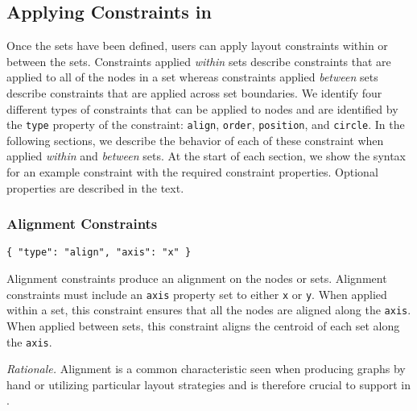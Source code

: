 \subsection{Applying Constraints in \projectname}
\label{sec:constraints}
Once the sets have been defined, users can apply layout constraints within or between the sets. Constraints applied \emph{within} sets describe constraints that are applied to all of the nodes in a set whereas constraints applied \emph{between} sets describe constraints that are applied across set boundaries. We identify four different types of constraints that can be applied to nodes and are identified by the \texttt{type} property of the constraint: \texttt{align}, \texttt{order}, \texttt{position}, and \texttt{circle}. In the following sections, we describe the behavior of each of these constraint when applied \emph{within} and \emph{between} sets. At the start of each section, we show the syntax for an example constraint with the required constraint properties. Optional properties are described in the text.

\subsubsection{Alignment Constraints}
\begin{verbatim}
{ "type": "align", "axis": "x" }
\end{verbatim}
Alignment constraints produce an alignment on the nodes or sets. Alignment constraints must include an \texttt{axis} property set to either \texttt{x} or \texttt{y}.  When applied within a set, this constraint ensures that all the nodes are aligned along the \texttt{axis}. When applied between sets, this constraint aligns the centroid of each set along the \texttt{axis}.


\emph{Rationale.} Alignment is a common characteristic seen when producing graphs by hand  or utilizing particular layout strategies and is therefore crucial to support in \projectname.

